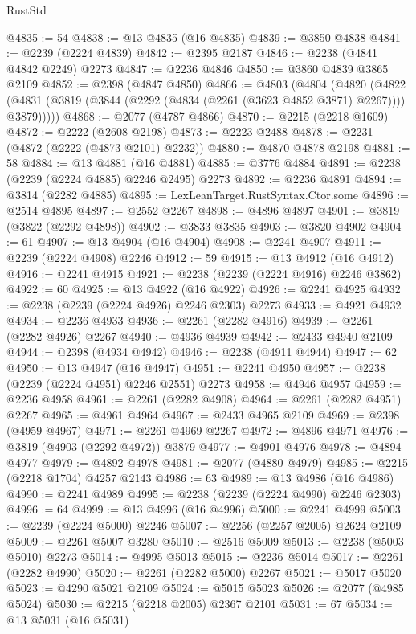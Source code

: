 \begin{lexlean}{RustStd}
\begin{coremodule}
@4835 := 54
@4838 := @13 @4835 (@16 @4835)
@4839 := @3850 @4838
@4841 := @2239 (@2224 @4839)
@4842 := @2395 @2187
@4846 := @2238 (@4841 @4842 @2249) @2273
@4847 := @2236 @4846
@4850 := @3860 @4839 @3865 @2109
@4852 := @2398 (@4847 @4850)
@4866 := @4803
    (@4804
      (@4820
        (@4822 (@4831 (@3819 (@3844 (@2292 (@4834 (@2261 (@3623 @4852 @3871) @2267)))) @3879)))))
@4868 := @2077 (@4787 @4866)
@4870 := @2215 (@2218 @1609)
@4872 := @2222 (@2608 @2198)
@4873 := @2223 @2488
@4878 := @2231 (@4872 (@2222 (@4873 @2101) @2232))
@4880 := @4870 @4878 @2198
@4881 := 58
@4884 := @13 @4881 (@16 @4881)
@4885 := @3776 @4884
@4891 := @2238 (@2239 (@2224 @4885) @2246 @2495) @2273
@4892 := @2236 @4891
@4894 := @3814 (@2282 @4885)
@4895 := LexLeanTarget.RustSyntax.Ctor.some
@4896 := @2514 @4895
@4897 := @2552 @2267
@4898 := @4896 @4897
@4901 := @3819 (@3822 (@2292 @4898))
@4902 := @3833 @3835
@4903 := @3820 @4902
@4904 := 61
@4907 := @13 @4904 (@16 @4904)
@4908 := @2241 @4907
@4911 := @2239 (@2224 @4908) @2246
@4912 := 59
@4915 := @13 @4912 (@16 @4912)
@4916 := @2241 @4915
@4921 := @2238 (@2239 (@2224 @4916) @2246 @3862)
@4922 := 60
@4925 := @13 @4922 (@16 @4922)
@4926 := @2241 @4925
@4932 := @2238 (@2239 (@2224 @4926) @2246 @2303) @2273
@4933 := @4921 @4932
@4934 := @2236 @4933
@4936 := @2261 (@2282 @4916)
@4939 := @2261 (@2282 @4926) @2267
@4940 := @4936 @4939
@4942 := @2433 @4940 @2109
@4944 := @2398 (@4934 @4942)
@4946 := @2238 (@4911 @4944)
@4947 := 62
@4950 := @13 @4947 (@16 @4947)
@4951 := @2241 @4950
@4957 := @2238 (@2239 (@2224 @4951) @2246 @2551) @2273
@4958 := @4946 @4957
@4959 := @2236 @4958
@4961 := @2261 (@2282 @4908)
@4964 := @2261 (@2282 @4951) @2267
@4965 := @4961 @4964
@4967 := @2433 @4965 @2109
@4969 := @2398 (@4959 @4967)
@4971 := @2261 @4969 @2267
@4972 := @4896 @4971
@4976 := @3819 (@4903 (@2292 @4972)) @3879
@4977 := @4901 @4976
@4978 := @4894 @4977
@4979 := @4892 @4978
@4981 := @2077 (@4880 @4979)
@4985 := @2215 (@2218 @1704) @4257 @2143
@4986 := 63
@4989 := @13 @4986 (@16 @4986)
@4990 := @2241 @4989
@4995 := @2238 (@2239 (@2224 @4990) @2246 @2303)
@4996 := 64
@4999 := @13 @4996 (@16 @4996)
@5000 := @2241 @4999
@5003 := @2239 (@2224 @5000) @2246
@5007 := @2256 (@2257 @2005) @2624 @2109
@5009 := @2261 @5007 @3280
@5010 := @2516 @5009
@5013 := @2238 (@5003 @5010) @2273
@5014 := @4995 @5013
@5015 := @2236 @5014
@5017 := @2261 (@2282 @4990)
@5020 := @2261 (@2282 @5000) @2267
@5021 := @5017 @5020
@5023 := @4290 @5021 @2109
@5024 := @5015 @5023
@5026 := @2077 (@4985 @5024)
@5030 := @2215 (@2218 @2005) @2367 @2101
@5031 := 67
@5034 := @13 @5031 (@16 @5031)

\end{coremodule}
\end{lexlean}
